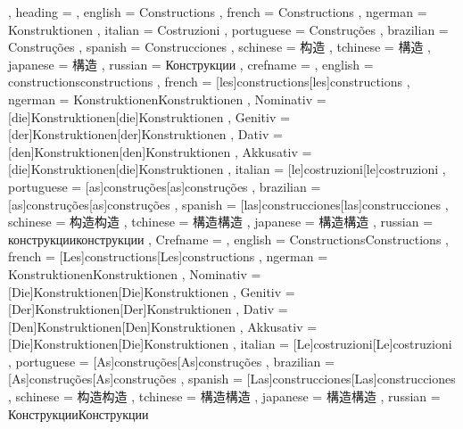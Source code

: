   {
    , heading =   {
                    , english     = Constructions
                    , french      = Constructions
                    , ngerman     = Konstruktionen
                    , italian     = Costruzioni
                    , portuguese  = Construções
                    , brazilian   = Construções
                    , spanish     = Construcciones
                    , schinese    = 构造
                    , tchinese    = 構造
                    , japanese    = 構造
                    , russian     = Конструкции
                  }
    , crefname =  {
                    , english     = {constructions}{constructions}
                    , french      = [les]{constructions}[les]{constructions}
                    , ngerman     = { {Konstruktionen}{Konstruktionen}
                                      , Nominativ = [die]{Konstruktionen}[die]{Konstruktionen}
                                      , Genitiv   = [der]{Konstruktionen}[der]{Konstruktionen}
                                      , Dativ     = [den]{Konstruktionen}[den]{Konstruktionen}
                                      , Akkusativ = [die]{Konstruktionen}[die]{Konstruktionen}
                                    }
                    , italian     = [le]{costruzioni}[le]{costruzioni}
                    , portuguese  = [as]{construções}[as]{construções}
                    , brazilian   = [as]{construções}[as]{construções}
                    , spanish     = [las]{construcciones}[las]{construcciones}
                    , schinese    = {构造}{构造}
                    , tchinese    = {構造}{構造}
                    , japanese    = {構造}{構造}
                    , russian     = {конструкции}{конструкции}
                  }
    , Crefname =  {
                    , english     = {Constructions}{Constructions}
                    , french      = [Les]{constructions}[Les]{constructions}
                    , ngerman     = { {Konstruktionen}{Konstruktionen}
                                      , Nominativ = [Die]{Konstruktionen}[Die]{Konstruktionen}
                                      , Genitiv   = [Der]{Konstruktionen}[Der]{Konstruktionen}
                                      , Dativ     = [Den]{Konstruktionen}[Den]{Konstruktionen}
                                      , Akkusativ = [Die]{Konstruktionen}[Die]{Konstruktionen}
                                    }
                    , italian     = [Le]{costruzioni}[Le]{costruzioni}
                    , portuguese  = [As]{construções}[As]{construções}
                    , brazilian   = [As]{construções}[As]{construções}
                    , spanish     = [Las]{construcciones}[Las]{construcciones}
                    , schinese    = {构造}{构造}
                    , tchinese    = {構造}{構造}
                    , japanese    = {構造}{構造}
                    , russian     = {Конструкции}{Конструкции}
                  }
  }

